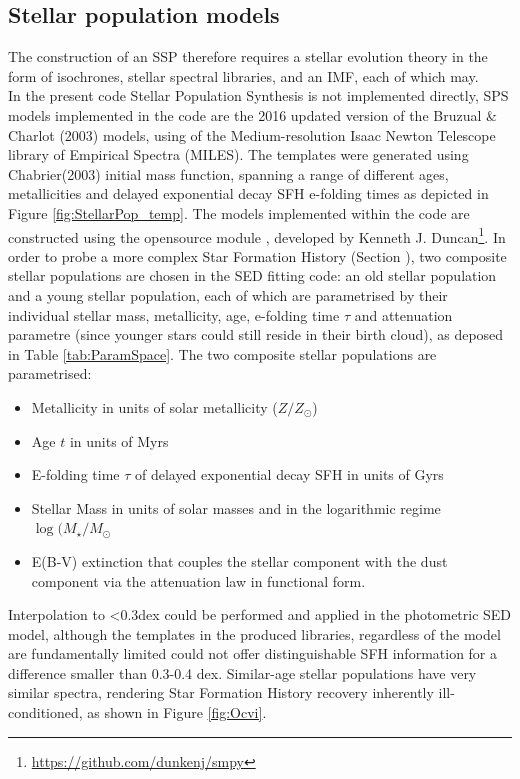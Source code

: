 \subsection{Stellar population models}

The construction of an SSP therefore requires a stellar evolution theory in the form of isochrones, stellar spectral libraries, and an IMF, each of which may. \\
In the present code Stellar Population Synthesis is not implemented directly, SPS models implemented in the code are the 2016 updated version of the Bruzual \& Charlot (2003)\cite{BC2003} models, using of the Medium-resolution Isaac Newton Telescope library of Empirical Spectra (MILES)\cite{MILES1}\cite{MILES2}\cite{MILES3}. The templates were generated using Chabrier(2003)\cite{Chabrier2003} initial mass function, spanning a range of different ages, metallicities and delayed exponential decay SFH e-folding times as depicted in Figure \ref{fig:StellarPop_temp}. The models implemented within the code are constructed using the opensource module , developed by Kenneth J. Duncan\footnote{\url{https://github.com/dunkenj/smpy}}.
In order to probe a more complex Star Formation History (Section \label{sec:SFH}), two composite stellar populations are chosen in the SED fitting code: an old stellar population and a young stellar population, each of which are parametrised by their individual stellar mass, metallicity, age, e-folding time $\tau$ and attenuation parametre (since younger stars could still reside in their birth cloud), as deposed in Table \ref{tab:ParamSpace}. The two composite stellar populations are parametrised:
\begin{itemize}
    \item Metallicity in units of solar metallicity ($Z/Z_\odot$)
    \item Age $t$ in units of Myrs
    \item E-folding time $\tau$ of delayed exponential decay SFH in units of Gyrs
    \item Stellar Mass in units of solar masses and in the logarithmic regime $\log (M_\star/M_\odot$
    \item E(B-V) extinction that couples the stellar component with the dust component via the attenuation law in functional form.
\end{itemize}
Interpolation to <0.3dex could be performed and applied in the photometric SED model, although the templates in the produced libraries, regardless of the model are fundamentally limited could not offer distinguishable SFH information for a difference smaller than 0.3-0.4 dex\cite{Ocvirk2006}. Similar-age stellar populations have very similar spectra, rendering Star Formation History recovery inherently ill-conditioned\cite{Lower2020}, as shown in Figure \ref{fig:Ocvi}.
